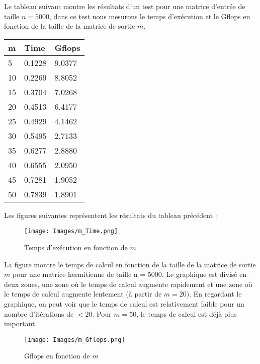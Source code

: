 \documentclass[11pt,french]{article}
\begin{document}
    Le tableau suivant montre les résultats d'un test pour une matrice d'entrée de taille $n=5000$, dans ce test nous mesurons le temps d'exécution et le Gflops en fonction de la taille de la matrice de sortie $m$.
    \begin{table}[htbp]

    \centering
    \begin{tabular}{ |p{3cm}|p{3cm}|p{3cm}|  }
    \hline
    m & Time & Gflops \\
    \hline
    5   &  0.1228   &  9.0377\\
    10   &  0.2269  &   8.8052\\
    15   &  0.3704  &   7.0268\\
    20   &  0.4513  &   6.4177\\
    25   &  0.4929  &   4.1462\\
    30   &  0.5495  &   2.7133\\
    35  &   0.6277  &   2.8880\\
    40   &  0.6555  &   2.0950\\
    45    & 0.7281  &   1.9052\\
    50   & 0.7839  &   1.8901\\
    \hline
    \end{tabular}
    \end{table}
	
	\newpage
    Les figures suivantes représentent les résultats du tableau précédent :
    
    \begin{figure}[h]
    \centering
    \texttt{[image: Images/m\_Time.png]}
    \caption{Temps d'exécution en fonction de $m$}
    \label{fig:mesh1}
    \end{figure}
    \FloatBarrier
    
    La figure montre le temps de calcul en fonction de la taille de la matrice de sortie $m$ pour une matrice hermitienne de taille n = 5000. Le graphique est divisé en deux zones, une zone où le temps de calcul augmente rapidement et une zone où le temps de calcul augmente lentement (à partir de $m=20$).
    En regardant le graphique, on peut voir que le temps de calcul est relativement faible pour un nombre d'itérations de $<20$. Pour $m=50$, le temps de calcul est déjà plus important. 
    \begin{figure}[h]
    \centering
    \texttt{[image: Images/m\_Gflops.png]}
    \caption{Gflops en fonction de $m$}
    \label{fig:mesh1}
    \end{figure}
    \FloatBarrier
    
\end{document}
